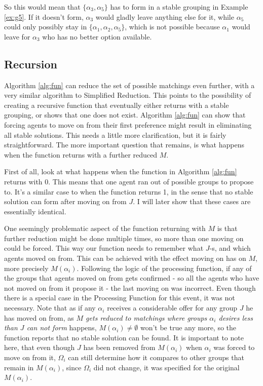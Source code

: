 \documentclass{elsarticle}
\begin{document}
So this would mean that $\{\alpha_3 , \alpha_5\}$ has to form in a stable grouping in Example \ref{ex:g5}. If it doesn't form, $\alpha_3$ would gladly leave anything else for it, while $\alpha_5$ could only possibly stay in $\{\alpha_1 , \alpha_2, \alpha_5\}$, which is not possible because $\alpha_1$ would leave for $\alpha_3$ who has no better option available.

\subsection{Recursion}

Algorithm \ref{alg:fun} can reduce the set of possible matchings even further, with a very similar algorithm to Simplified Reduction. This points to the possibility of creating a recursive function that eventually either returns with a stable grouping, or shows that one does not exist. Algorithm \ref{alg:fun} can show that forcing agents to move on from their first preference might result in eliminating all stable solutions. This needs a little more clarification, but it is fairly straightforward. The more important question that remains, is what happens when the function returns with a further reduced $M$.

First of all, look at what happens when the function in Algorithm \ref{alg:fun} returns with 0. This means that one agent ran out of possible groups to propose to. It's a similar case to when the function returns 1, in the sense that no stable solution can form after moving on from $J$. I will later show that these cases are essentially identical.

One seemingly problematic aspect of the function returning with $M$ is that further reduction might be done multiple times, so more than one moving on could be forced. This way our function needs to remember what $J$-s, and which agents moved on from. This can be achieved with the effect moving on has on $M$, more precisely $M(\alpha_i)$. Following the logic of the processing function, if any of the groups that agents moved on from gets confirmed - so all the agents who have not moved on from it propose it - the last moving on was incorrect. Even though there is a special case in the Processing Function for this event, it was not necessary. Note that as if any $\alpha_i$ receives a considerable offer for any group $J$ he has moved on from, as \textit{$M$ gets reduced to matchings where groups $\alpha_i$ desires less than $J$ can not form} happens, $M(\alpha_i) \neq \emptyset$ won't be true any more, so the function reports that no stable solution can be found. It is important to note here, that even though $J$ has been removed from $M(\alpha_i)$ when $\alpha_i$ was forced to move on from it, $\Omega_i$ can still determine how it compares to other groups that remain in $M(\alpha_i)$, since $\Omega_i$ did not change, it was specified for the original $M(\alpha_i)$.
\end{document}
